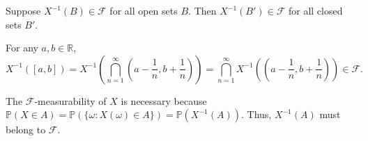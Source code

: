 \documentclass{huhtakm-template-book}
\newcommand{\prob}{\mathbb{P}}
\begin{document}
    \begin{cla}
        Suppose $X^{-1}(B)\in\mathcal{F}$ for all open sets $B$. Then $X^{-1}(B')\in\mathcal{F}$ for all closed sets $B'$.
    \end{cla}
    \begin{proofing}
        For any $a,b\in\mathbb{R}$,
        \begin{equation*}
            X^{-1}([a,b])=X^{-1}\left(\bigcap_{n=1}^{\infty}\left(a-\frac{1}{n},b+\frac{1}{n}\right)\right)=\bigcap_{n=1}^{\infty}X^{-1}\left(\left(a-\frac{1}{n},b+\frac{1}{n}\right)\right)\in\mathcal{F}.
        \end{equation*}
    \end{proofing}
    \begin{rem}
        The $\mathcal{F}$-measurability of $X$ is necessary because $\prob(X\in A)=\prob(\{\omega:X(\omega)\in A\})=\prob(X^{-1}(A))$. Thus, $X^{-1}(A)$ must belong to $\mathcal{F}$.
    \end{rem}
    
\end{document}
